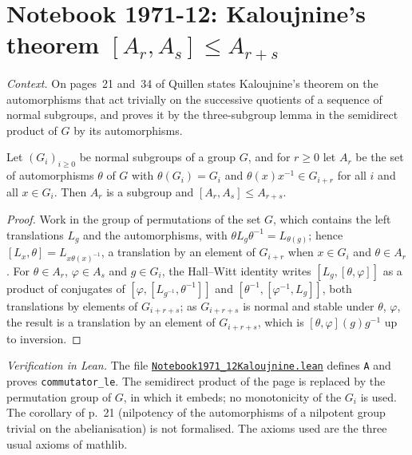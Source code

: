 \section[Notebook 1971-12: Kaloujnine's theorem]{Notebook 1971-12: Kaloujnine's theorem $[A_r, A_s] \le A_{r+s}$\protect{}}\label{sec:quillen-1971-12-kaloujnine}

\emph{Context.} On pages~21 and~34 of  Quillen states Kaloujnine's theorem on the automorphisms that act trivially on the successive quotients of a sequence of normal subgroups, and proves it by the three-subgroup lemma in the semidirect product of $G$ by its automorphisms.

\begin{encadre}
\begin{theoreme}\label{thm:quillen-1971-12-kaloujnine}
Let $(G_i)_{i \ge 0}$ be normal subgroups of a group $G$, and for $r \ge 0$ let $A_r$ be the set of automorphisms $\theta$ of $G$ with $\theta(G_i) = G_i$ and $\theta(x)x^{-1} \in G_{i+r}$ for all $i$ and all $x \in G_i$. Then $A_r$ is a subgroup and $[A_r, A_s] \le A_{r+s}$.
\end{theoreme}
\end{encadre}

\begin{proof}
Work in the group of permutations of the set $G$, which contains the left translations $L_g$ and the automorphisms, with $\theta L_g\theta^{-1} = L_{\theta(g)}$; hence $[L_x, \theta] = L_{x\theta(x)^{-1}}$, a translation by an element of $G_{i+r}$ when $x \in G_i$ and $\theta \in A_r$. For $\theta \in A_r$, $\varphi \in A_s$ and $g \in G_i$, the Hall--Witt identity writes $[L_g, [\theta, \varphi]]$ as a product of conjugates of $[\varphi, [L_{g^{-1}}, \theta^{-1}]]$ and $[\theta^{-1}, [\varphi^{-1}, L_g]]$, both translations by elements of $G_{i+r+s}$; as $G_{i+r+s}$ is normal and stable under $\theta$, $\varphi$, the result is a translation by an element of $G_{i+r+s}$, which is $[\theta,\varphi](g)g^{-1}$ up to inversion.
\end{proof}

\emph{Verification in Lean.} The file \href{\leanblobmain/Notebook1971_12Kaloujnine.lean}{\texttt{Notebook1971\_12Kaloujnine.\allowbreak{}lean}} defines \texttt{A} and proves \texttt{commutator\_le}. The semidirect product of the page is replaced by the permutation group of $G$, in which it embeds; no monotonicity of the $G_i$ is used. The corollary of p.~21 (nilpotency of the automorphisms of a nilpotent group trivial on the abelianisation) is not formalised. The axioms used are the three usual axioms of mathlib.


